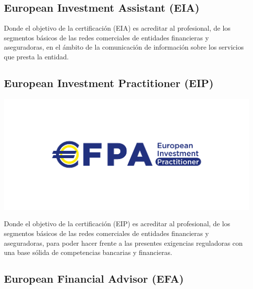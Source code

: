 \documentclass[
  letterpaper,
  DIV=11,
  numbers=noendperiod]{scrreprt}
\begin{document}

\hypertarget{european-investment-assistant-eia}{%
\subsection*{\texorpdfstring{\textbf{European Investment Assistant
(EIA)}}{European Investment Assistant (EIA)}}\label{european-investment-assistant-eia}}

Donde el objetivo de la certificación (EIA) es acreditar al profesional,
de los segmentos básicos de las redes comerciales de entidades
financieras y aseguradoras, en el ámbito de la comunicación de
información sobre los servicios que presta la entidad.

\hypertarget{european-investment-practitioner-eip}{%
\subsection*{\texorpdfstring{\textbf{European Investment Practitioner
(EIP)}}{European Investment Practitioner (EIP)}}\label{european-investment-practitioner-eip}}

\includegraphics{./images/EIP_logo.jpg}

Donde el objetivo de la certificación (EIP) es acreditar al profesional,
de los segmentos básicos de las redes comerciales de entidades
financieras y aseguradoras, para poder hacer frente a las presentes
exigencias reguladoras con una base sólida de competencias bancarias y
financieras.

\hypertarget{european-financial-advisor-efa}{%
\subsection*{\texorpdfstring{\textbf{European Financial Advisor
(EFA)}}{European Financial Advisor (EFA)}}\label{european-financial-advisor-efa}}
\end{document}
